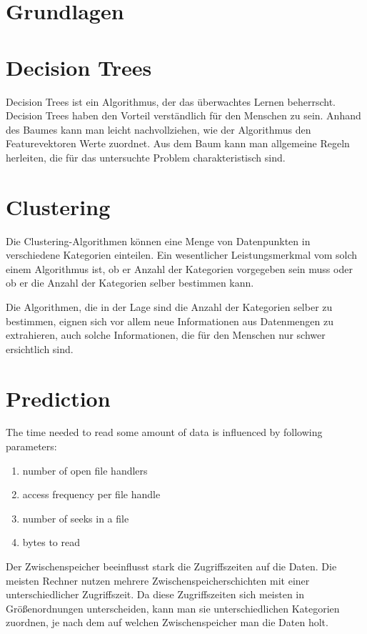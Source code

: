 \section{Grundlagen}



\section{Decision Trees}
Decision Trees ist ein Algorithmus, der das überwachtes Lernen beherrscht. 
Decision Trees haben den Vorteil verständlich für den Menschen zu sein. 
Anhand des Baumes kann man leicht nachvollziehen, wie der Algorithmus den Featurevektoren Werte zuordnet. 
Aus dem Baum kann man allgemeine Regeln herleiten, die für das untersuchte Problem charakteristisch sind.

\section{Clustering}
Die Clustering-Algorithmen können eine Menge von Datenpunkten in verschiedene Kategorien einteilen. Ein wesentlicher Leistungsmerkmal vom solch einem Algorithmus ist, ob er Anzahl der Kategorien vorgegeben sein muss oder ob er die Anzahl der Kategorien selber bestimmen kann.

Die Algorithmen, die in der Lage sind die Anzahl der Kategorien selber zu bestimmen, eignen sich vor allem neue Informationen aus Datenmengen zu extrahieren, auch solche Informationen, die für den Menschen nur schwer ersichtlich sind. 





\section{Prediction}

The time needed to read some amount of data is influenced by following parameters:

\begin{enumerate}
	\item number of open file handlers
	\item access frequency per file handle
	\item number of seeks in a file
	\item bytes to read
\end{enumerate}
Der Zwischenspeicher beeinflusst stark die Zugriffszeiten auf die Daten. 
Die meisten Rechner nutzen mehrere Zwischenspeicherschichten mit einer unterschiedlicher Zugriffszeit.
Da diese Zugriffszeiten sich meisten in Größenordnungen unterscheiden, kann man sie unterschiedlichen Kategorien zuordnen, je nach dem auf welchen Zwischenspeicher man die Daten holt.

